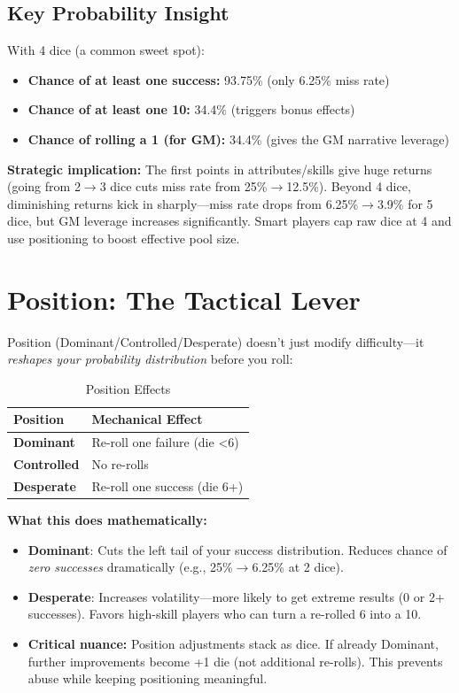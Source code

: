 \documentclass[11pt]{article}
\begin{document}
\subsection{Key Probability Insight}
With 4 dice (a common sweet spot):
\begin{itemize}
    \item \textbf{Chance of at least one success:} 93.75\% (only 6.25\% miss rate)
    \item \textbf{Chance of at least one 10:} 34.4\% (triggers bonus effects)
    \item \textbf{Chance of rolling a 1 (for GM):} 34.4\% (gives the GM narrative leverage)
\end{itemize}

\textbf{Strategic implication:} The first points in attributes/skills give huge returns (going from 2$\rightarrow$3 dice cuts miss rate from 25\%$\rightarrow$12.5\%). Beyond 4 dice, diminishing returns kick in sharply---miss rate drops from 6.25\%$\rightarrow$3.9\% for 5 dice, but GM leverage increases significantly. Smart players cap raw dice at 4 and use positioning to boost effective pool size.

\section{Position: The Tactical Lever}

Position (Dominant/Controlled/Desperate) doesn't just modify difficulty---it \textit{reshapes your probability distribution} before you roll:

\begin{table}[h]
\centering
\caption{Position Effects}
\begin{tabular}{>{\bfseries}l l}
\toprule
Position & Mechanical Effect \\
\midrule
Dominant & Re-roll one failure (die <6) \\
Controlled & No re-rolls \\
Desperate & Re-roll one success (die 6+) \\
\bottomrule
\end{tabular}
\end{table}

\textbf{What this does mathematically:}
\begin{itemize}
    \item \textbf{Dominant}: Cuts the left tail of your success distribution. Reduces chance of \textit{zero successes} dramatically (e.g., 25\%$\rightarrow$6.25\% at 2 dice).
    \item \textbf{Desperate}: Increases volatility---more likely to get extreme results (0 or 2+ successes). Favors high-skill players who can turn a re-rolled 6 into a 10.
    \item \textbf{Critical nuance:} Position adjustments stack as dice. If already Dominant, further improvements become +1 die (not additional re-rolls). This prevents abuse while keeping positioning meaningful.
\end{itemize}
\end{document}

